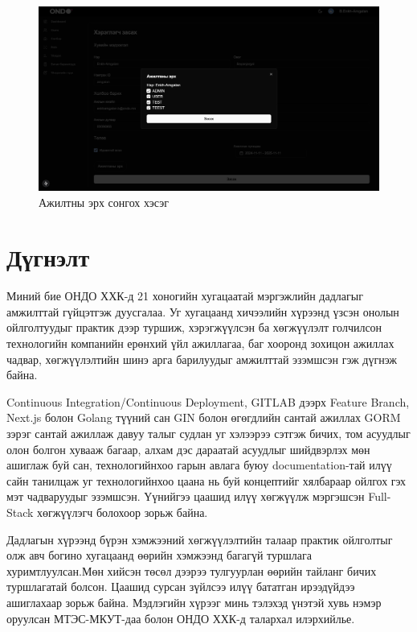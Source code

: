 \begin{figure}
	\centering
	\includegraphics[width=15cm]{images/role.png}
	\caption{Ажилтны эрх сонгох хэсэг}
\end{figure}
\pagebreak

\clearpage

\section{Дүгнэлт}
Миний бие ОНДО ХХК-д 21 хоногийн хугацаатай мэргэжлийн дадлагыг амжилттай гүйцэтгэж дуусгалаа. Уг хугацаанд хичээлийн хүрээнд үзсэн онолын ойлголтуудыг практик дээр туршиж, хэрэгжүүлсэн ба хөгжүүлэлт голчилсон технологийн компанийн ерөнхий үйл ажиллагаа, баг хооронд зохицон ажиллах чадвар, хөгжүүлэлтийн шинэ арга барилуудыг амжилттай эзэмшсэн гэж дүгнэж байна.

\quad Continuous Integration/Continuous Deployment, GITLAB дээрх Feature Branch, Next.js болон Golang түүний сан GIN болон өгөгдлийн сантай ажиллах GORM зэрэг сантай ажиллаж давуу талыг судлан уг хэлээрээ сэтгэж бичих, том асуудлыг олон болгон хувааж багаар, алхам дэс дараатай асуудлыг шийдвэрлэх мөн ашиглаж буй сан, технологийнхоо гарын авлага буюу documentation-тай илүү сайн танилцаж уг технологийнхоо цаана нь буй концептийг хялбараар ойлгох гэх мэт чадваруудыг эзэмшсэн. Үүнийгээ цаашид илүү хөгжүүлж мэргэшсэн Full-Stack хөгжүүлэгч болохоор зорьж байна. 

\quad Дадлагын хүрээнд бүрэн хэмжээний хөгжүүлэлтийн талаар практик ойлголтыг олж авч богино хугацаанд өөрийн хэмжээнд багагүй туршлага хуримтлуулсан.Мөн хийсэн төсөл дээрээ тулгуурлан өөрийн
тайланг бичих туршлагатай болсон. Цаашид сурсан зүйлсээ илүү бататган ирээдүйдээ ашиглахаар зорьж байна. Мэдлэгийн хүрээг минь тэлэхэд үнэтэй хувь нэмэр оруулсан МТЭС-МКУТ-даа болон ОНДО ХХК-д талархал илэрхийлье.